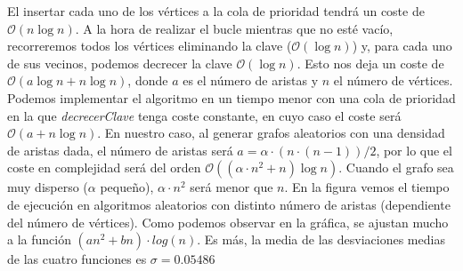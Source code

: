 \documentclass{article}
\begin{document}
\begin{figure}
\centering
{}
\end{figure}

El insertar cada uno de los vértices a la cola de prioridad tendrá un coste de $\mathcal{O}(n\log n)$. A la hora de realizar el bucle mientras que no esté vacío, recorreremos todos los vértices eliminando la clave ($\mathcal{O} (\log n)$) y, para cada uno de sus vecinos, podemos decrecer la clave $\mathcal{O}(\log n)$. Esto nos deja un coste de $\mathcal{O}\left(a\log n+n\log n\right)$, donde $a$ es el número de aristas y $n$ el número de vértices. Podemos implementar el algoritmo en un tiempo menor con una cola de prioridad en la que \textit{decrecerClave} tenga coste constante, en cuyo caso el coste será $\mathcal{O}(a + n\log n)$. En nuestro caso, al generar grafos aleatorios con una densidad de aristas dada, el número de aristas será $a = \alpha\cdot(n\cdot(n-1))/2$, por lo que el coste en complejidad será del orden $\mathcal{O}((\alpha\cdot n^2+n)\log n)$. Cuando el grafo sea muy disperso ($\alpha$ pequeño), $\alpha\cdot n^2$ será menor que $n$. En la figura vemos el tiempo de ejecución en algoritmos aleatorios con distinto número de aristas (dependiente del número de vértices). Como podemos observar en la gráfica, se ajustan mucho a la función $(an^2+bn)\cdot log(n)$. Es más, la media de las desviaciones medias de las cuatro funciones es $\sigma=0.05486$

\nocite{*} %


\end{document}
